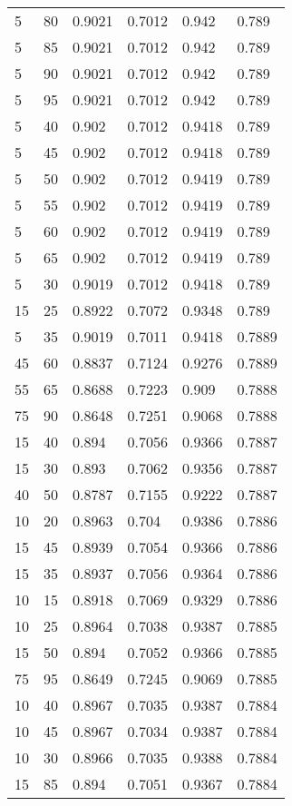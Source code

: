 \begin{center}
\begin{longtable}{|l|l|l|l|l|l|}
5  & 80 & 0.9021 & 0.7012 & 0.942  & 0.789  \\
5  & 85 & 0.9021 & 0.7012 & 0.942  & 0.789  \\
5  & 90 & 0.9021 & 0.7012 & 0.942  & 0.789  \\
5  & 95 & 0.9021 & 0.7012 & 0.942  & 0.789  \\
5  & 40 & 0.902  & 0.7012 & 0.9418 & 0.789  \\
5  & 45 & 0.902  & 0.7012 & 0.9418 & 0.789  \\
5  & 50 & 0.902  & 0.7012 & 0.9419 & 0.789  \\
5  & 55 & 0.902  & 0.7012 & 0.9419 & 0.789  \\
5  & 60 & 0.902  & 0.7012 & 0.9419 & 0.789  \\
5  & 65 & 0.902  & 0.7012 & 0.9419 & 0.789  \\
5  & 30 & 0.9019 & 0.7012 & 0.9418 & 0.789  \\
15 & 25 & 0.8922 & 0.7072 & 0.9348 & 0.789  \\
5  & 35 & 0.9019 & 0.7011 & 0.9418 & 0.7889 \\
45 & 60 & 0.8837 & 0.7124 & 0.9276 & 0.7889 \\
55 & 65 & 0.8688 & 0.7223 & 0.909  & 0.7888 \\
75 & 90 & 0.8648 & 0.7251 & 0.9068 & 0.7888 \\
15 & 40 & 0.894  & 0.7056 & 0.9366 & 0.7887 \\
15 & 30 & 0.893  & 0.7062 & 0.9356 & 0.7887 \\
40 & 50 & 0.8787 & 0.7155 & 0.9222 & 0.7887 \\
10 & 20 & 0.8963 & 0.704  & 0.9386 & 0.7886 \\
15 & 45 & 0.8939 & 0.7054 & 0.9366 & 0.7886 \\
15 & 35 & 0.8937 & 0.7056 & 0.9364 & 0.7886 \\
10 & 15 & 0.8918 & 0.7069 & 0.9329 & 0.7886 \\
10 & 25 & 0.8964 & 0.7038 & 0.9387 & 0.7885 \\
15 & 50 & 0.894  & 0.7052 & 0.9366 & 0.7885 \\
75 & 95 & 0.8649 & 0.7245 & 0.9069 & 0.7885 \\
10 & 40 & 0.8967 & 0.7035 & 0.9387 & 0.7884 \\
10 & 45 & 0.8967 & 0.7034 & 0.9387 & 0.7884 \\
10 & 30 & 0.8966 & 0.7035 & 0.9388 & 0.7884 \\
15 & 85 & 0.894  & 0.7051 & 0.9367 & 0.7884 \\

\end{longtable}
\end{center}
